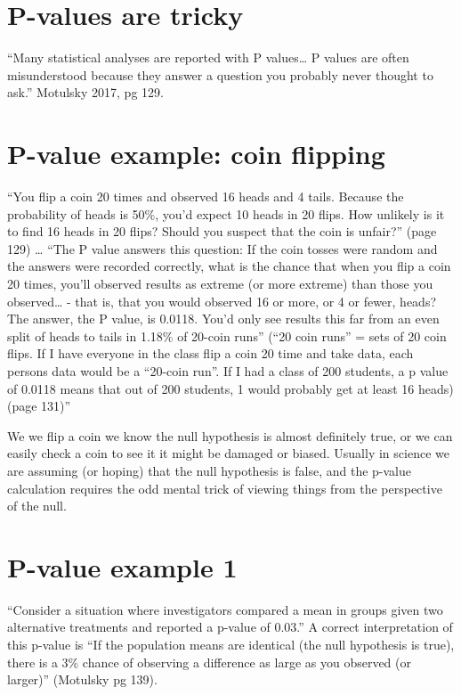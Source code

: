 \documentclass[
]{book}
\begin{document}
\hypertarget{p-values-are-tricky}{%
\chapter{P-values are tricky}\label{p-values-are-tricky}}

``Many statistical analyses are reported with P values\ldots{} P values are often misunderstood because they answer a question you probably never thought to ask.'' Motulsky 2017, pg 129.

\hypertarget{p-value-example-coin-flipping}{%
\chapter{P-value example: coin flipping}\label{p-value-example-coin-flipping}}

``You flip a coin 20 times and observed 16 heads and 4 tails. Because the probability of heads is 50\%, you'd expect 10 heads in 20 flips. How unlikely is it to find 16 heads in 20 flips? Should you suspect that the coin is unfair?'' (page 129) \ldots{} ``The P value answers this question: If the coin tosses were random and the answers were recorded correctly, what is the chance that when you flip a coin 20 times, you'll observed results as extreme (or more extreme) than those you observed\ldots{} - that is, that you would observed 16 or more, or 4 or fewer, heads? The answer, the P value, is 0.0118. You'd only see results this far from an even split of heads to tails in 1.18\% of 20-coin runs'' (``20 coin runs'' = sets of 20 coin flips. If I have everyone in the class flip a coin 20 time and take data, each persons data would be a ``20-coin run''. If I had a class of 200 students, a p value of 0.0118 means that out of 200 students, 1 would probably get at least 16 heads) (page 131)''

We we flip a coin we know the null hypothesis is almost definitely true, or we can easily check a coin to see it it might be damaged or biased. Usually in science we are assuming (or hoping) that the null hypothesis is false, and the p-value calculation requires the odd mental trick of viewing things from the perspective of the null.

\hypertarget{p-value-example-1}{%
\chapter{P-value example 1}\label{p-value-example-1}}

``Consider a situation where investigators compared a mean in groups given two alternative treatments and reported a p-value of 0.03.'' A correct interpretation of this p-value is ``If the population means are identical (the null hypothesis is true), there is a 3\% chance of observing a difference as large as you observed (or larger)'' (Motulsky pg 139).
\end{document}
